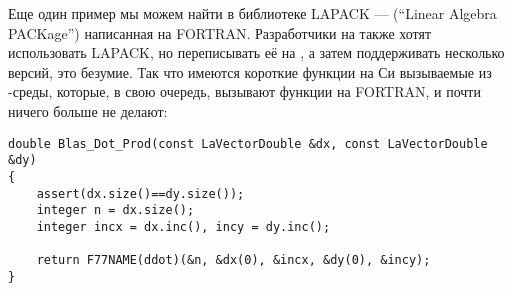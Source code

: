 Еще один пример мы можем найти в библиотеке LAPACK --- (``Linear Algebra PACKage'') написанная на FORTRAN.
Разработчики на \CCpp также хотят использовать LAPACK, но переписывать её на \CCpp, а затем поддерживать несколько версий,
это безумие.
Так что имеются короткие функции на Си вызываемые из \CCpp{}-среды, которые, в свою очередь, вызывают функции на FORTRAN,
и почти ничего больше не делают:

\begin{lstlisting}
double Blas_Dot_Prod(const LaVectorDouble &dx, const LaVectorDouble &dy)
{
    assert(dx.size()==dy.size());
    integer n = dx.size();
    integer incx = dx.inc(), incy = dy.inc();

    return F77NAME(ddot)(&n, &dx(0), &incx, &dy(0), &incy);
}
\end{lstlisting}


